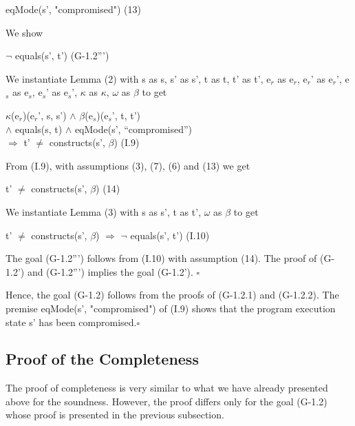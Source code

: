 \documentclass[conference]{IEEEtran}
\begin{document}
\begin{center}
eqMode(s', "compromised")  \hspace*{0.7cm} (13)
\end{center}

\noindent We show
\begin{center}
$\neg$ equals(s', t')  \hspace*{3cm} (G-1.2''')
\end{center}

\noindent We instantiate Lemma (2) with
s as s, s' as s', t as t, t' as t', e$_r$ as e$_r$, e$_r$' as e$_r$', e$_s$ as e$_s$, e$_s$' as e$_s$', $\kappa$ as $\kappa$, $\omega$ as $\beta$ to get

\begin{tabbing}
\textlbrackdbl $\kappa$\textrbrackdbl(e$_r$)(e$_r$', s, s') $\wedge$ \textlbrackdbl $\beta$\textrbrackdbl(e$_s$)(e$_s$', t, t') 
\\$\wedge$ equals(s, t) $\wedge$ eqMode(s', ``compromised'') 
\\$\Rightarrow$ t' $\neq$ constructs(s', $\beta$)  \hspace*{3cm} (I.9)
 \end{tabbing}

\noindent From (I.9), with assumptions (3), (7), (6) and (13) we get

\begin{center}
t' $\neq$ constructs(s', $\beta$)  \hspace*{1.7cm}(14)
 \end{center}
 
\noindent We instantiate Lemma (3) with
s as s', t as t', $\omega$ as $\beta$ to get

\begin{center}
t' $\neq$ constructs(s', $\beta$) $\Rightarrow$ $\neg$ equals(s', t')  \hspace*{0.3cm} (I.10)
\end{center}

The goal (G-1.2''') follows from (I.10) with assumption (14). The proof of (G-1.2') and (G-1.2''') implies the goal (G-1.2'). $\square$

\noindent Hence, the goal (G-1.2) follows from the proofs of (G-1.2.1) and (G-1.2.2). The premise eqMode(s', "compromised") of (I.9) shows that the program execution state s' has been compromised.$\square$

\subsection{Proof of the Completeness}
The proof of completeness is very similar to what we have already presented above for the soundness. However, the proof differs only for the goal (G-1.2) whose proof is presented in the previous subsection.
\end{document}
